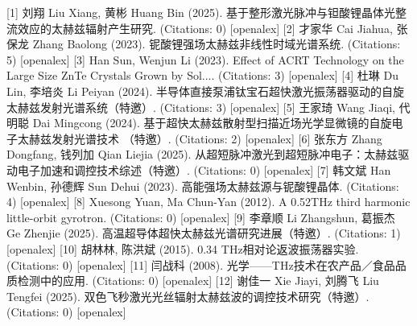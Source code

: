 \documentclass[12pt]{article}
\begin{document}
[1] 刘翔 Liu Xiang, 黄彬 Huang Bin (2025). 基于整形激光脉冲与钽酸锂晶体光整流效应的太赫兹辐射产生研究. (Citations: 0) [openalex]
[2] 才家华 Cai Jiahua, 张保龙 Zhang Baolong (2023). 铌酸锂强场太赫兹非线性时域光谱系统. (Citations: 5) [openalex]
[3] Han Sun, Wenjun Li (2023). Effect of ACRT Technology on the Large Size ZnTe Crystals Grown by Sol.... (Citations: 3) [openalex]
[4] 杜琳 Du Lin, 李培炎 Li Peiyan (2024). 半导体直接泵浦钛宝石超快激光振荡器驱动的自旋太赫兹发射光谱系统（特邀）. (Citations: 3) [openalex]
[5] 王家琦 Wang Jiaqi, 代明聪 Dai Mingcong (2024). 基于超快太赫兹散射型扫描近场光学显微镜的自旋电子太赫兹发射光谱技术 （特邀）. (Citations: 2) [openalex]
[6] 张东方 Zhang Dongfang, 钱列加 Qian Liejia (2025). 从超短脉冲激光到超短脉冲电子：太赫兹驱动电子加速和调控技术综述（特邀）. (Citations: 0) [openalex]
[7] 韩文斌 Han Wenbin, 孙德辉 Sun Dehui (2023). 高能强场太赫兹源与铌酸锂晶体. (Citations: 4) [openalex]
[8] Xuesong Yuan, Ma Chun-Yan (2012). A 0.52THz third harmonic little-orbit gyrotron. (Citations: 0) [openalex]
[9] 李章顺 Li Zhangshun, 葛振杰 Ge Zhenjie (2025). 高温超导体超快太赫兹光谱研究进展（特邀）. (Citations: 1) [openalex]
[10] 胡林林, 陈洪斌 (2015). 0.34 THz相对论返波振荡器实验. (Citations: 0) [openalex]
[11] 闫战科 (2008). 光学——THz技术在农产品／食品品质检测中的应用. (Citations: 0) [openalex]
[12] 谢佳一 Xie Jiayi, 刘腾飞 Liu Tengfei (2025). 双色飞秒激光光丝辐射太赫兹波的调控技术研究（特邀）. (Citations: 0) [openalex]




\end{document}
